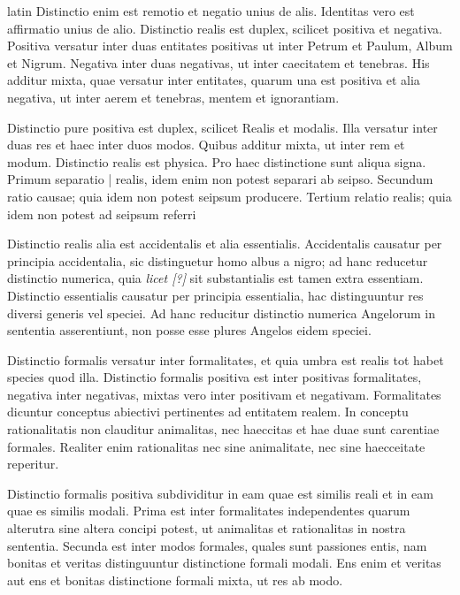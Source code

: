 \begin{otherlanguage*}{latin}
\pstart
Distinctio enim est remotio et negatio unius de alis. Identitas vero est affirmatio unius de alio. Distinctio realis est duplex, scilicet positiva et negativa. Positiva versatur inter duas entitates positivas ut inter Petrum et Paulum, Album et Nigrum. Negativa inter duas negativas, ut inter caecitatem et tenebras. His additur mixta, quae versatur inter entitates, quarum una est positiva et alia negativa, ut inter aerem et tenebras, mentem et ignorantiam. 
\pend

\pstart
Distinctio pure positiva est duplex, scilicet Realis et modalis. Illa versatur inter duas res et haec inter duos modos. Quibus additur mixta, ut inter rem et modum. Distinctio realis est physica. Pro haec distinctione sunt aliqua signa. Primum separatio \textnormal{|} realis, idem enim non potest separari ab seipso. Secundum ratio causae; quia idem non potest seipsum producere. Tertium relatio realis; quia idem non potest ad seipsum referri 
\pend

\pstart
Distinctio realis alia est accidentalis et alia essentialis. Accidentalis causatur per principia accidentalia, sic distinguetur homo albus a nigro; ad hanc reducetur distinctio numerica, quia \emph{licet [?]} sit substantialis est tamen extra essentiam. Distinctio essentialis causatur per principia essentialia, hac distinguuntur res diversi generis vel speciei. Ad hanc reducitur distinctio numerica Angelorum in sententia asserentiunt, non posse esse plures Angelos eidem speciei. 
\pend

\pstart
Distinctio formalis versatur inter formalitates, et quia umbra est realis tot habet species quod illa. Distinctio formalis positiva est inter positivas formalitates, negativa inter negativas, mixtas vero inter positivam et negativam. Formalitates dicuntur conceptus abiectivi pertinentes ad entitatem realem. In conceptu rationalitatis non clauditur animalitas, nec haeccitas et hae duae sunt carentiae formales. Realiter enim rationalitas nec sine animalitate, nec sine haecceitate reperitur. 
\pend

\pstart
Distinctio formalis positiva subdividitur in eam quae est similis reali et in eam quae es similis modali. Prima est inter formalitates independentes quarum alterutra sine altera concipi potest, ut animalitas et rationalitas in nostra sententia. Secunda est inter modos formales, quales sunt passiones entis, nam bonitas et veritas distinguuntur distinctione formali modali. Ens enim et veritas aut ens et bonitas distinctione formali mixta, ut res ab modo. 
\pend


\end{otherlanguage*}
